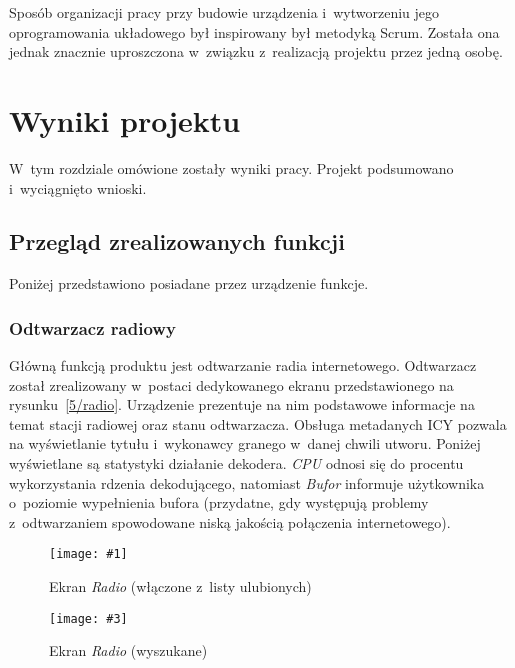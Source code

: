 \documentclass[polish]{aghengthesis}
\newcommand{\imgintss}[5]{
	\begin{figure}[{#5}]
		\centering
		\begin{minipage}{.45\textwidth}
			\centering
			\texttt{[image: \#1]}
			\caption{#2}
			\label{#1}
		\end{minipage}%
		\hfill
		\begin{minipage}{.45\textwidth}
			\centering
			\texttt{[image: \#3]}
			\caption{#4}
			\label{#3}
		\end{minipage}
	\end{figure}
}
\newcommand{\imghss}[4]{\imgintss{#1}{#2}{#3}{#4}{H}}
\begin{document}
		Sposób organizacji pracy przy budowie urządzenia i~wytworzeniu jego oprogramowania układowego był  inspirowany był metodyką Scrum. Została ona jednak znacznie uproszczona w~związku z~realizacją projektu przez jedną osobę.
	 	
\cleardoublepage
\chapter{Wyniki projektu}
	W~tym rozdziale omówione zostały wyniki pracy.
	Projekt podsumowano i~wyciągnięto wnioski.
	
	\section{Przegląd zrealizowanych funkcji}
		Poniżej przedstawiono posiadane przez urządzenie funkcje.
	
		\subsection{Odtwarzacz radiowy}			
			Główną funkcją produktu jest odtwarzanie radia internetowego. Odtwarzacz został zrealizowany w~postaci dedykowanego ekranu przedstawionego na rysunku~\ref{5/radio}. Urządzenie prezentuje na nim podstawowe informacje na temat stacji radiowej oraz stanu odtwarzacza. Obsługa metadanych ICY pozwala na wyświetlanie tytułu i~wykonawcy granego w~danej chwili utworu. Poniżej wyświetlane są statystyki działanie dekodera. \textit{CPU} odnosi się do procentu wykorzystania rdzenia dekodującego, natomiast \textit{Bufor} informuje użytkownika o~poziomie wypełnienia bufora (przydatne, gdy występują problemy z~odtwarzaniem spowodowane niską jakością połączenia internetowego).
			
			\imghss{5/radio}{Ekran \textit{Radio} (włączone z~listy ulubionych)}{5/radio_search}{Ekran \textit{Radio} (wyszukane)}
			
		
\end{document}
